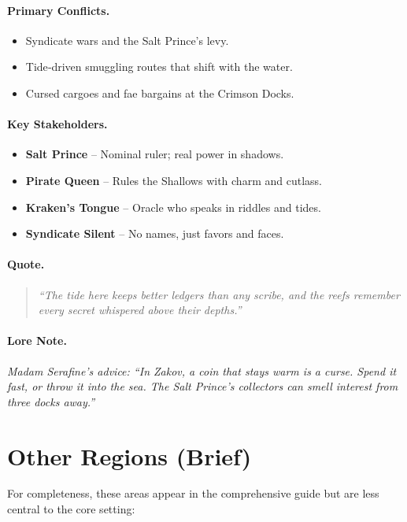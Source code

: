 \paragraph{Primary Conflicts.}
\begin{itemize}
  \item Syndicate wars and the Salt Prince’s levy.
  \item Tide‑driven smuggling routes that shift with the water.
  \item Cursed cargoes and fae bargains at the Crimson Docks.
\end{itemize}

\paragraph{Key Stakeholders.}
\begin{itemize}
  \item \textbf{Salt Prince} – Nominal ruler; real power in shadows.
  \item \textbf{Pirate Queen} – Rules the Shallows with charm and cutlass.
  \item \textbf{Kraken’s Tongue} – Oracle who speaks in riddles and tides.
  \item \textbf{Syndicate Silent} – No names, just favors and faces.
\end{itemize}

\paragraph{Quote.}
\begin{quote}
\emph{“The tide here keeps better ledgers than any scribe, and the reefs remember every secret whispered above their depths.”}
\end{quote}

\paragraph{Lore Note.}
\emph{Madam Serafine’s advice: “In Zakov, a coin that stays warm is a curse. Spend it fast, or throw it into the sea. The Salt Prince’s collectors can smell interest from three docks away.”}

\section{Other Regions (Brief)}
For completeness, these areas appear in the comprehensive guide but are less central to the core setting:

